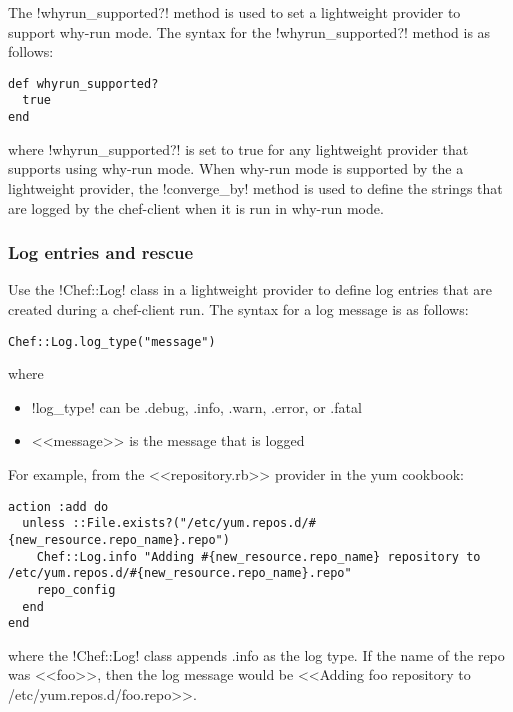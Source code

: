 The \inline!whyrun_supported?! method is used to set a lightweight provider to support why-run mode. The syntax for the \inline!whyrun_supported?! method is as follows:

\begin{lstlisting}[label=lst:cookbook-lwrp-why-run]
def whyrun_supported?
  true
end
\end{lstlisting}

where \inline!whyrun_supported?! is set to true for any lightweight provider that supports using why-run mode. When why-run mode is supported by the a lightweight provider, the \inline!converge_by! method is used to define the strings that are logged by the chef-client when it is run in why-run mode.

\subsubsection{Log entries and rescue}

Use the \inline!Chef::Log! class in a lightweight provider to define log entries that are created during a chef-client run. The syntax for a log message is as follows:

\begin{lstlisting}[label=lst:cookbook-lwrp-logs1]
Chef::Log.log_type("message")
\end{lstlisting}

where

\begin{itemize}
  \item \inline!log_type! can be .debug, .info, .warn, .error, or .fatal
  \item <<message>> is the message that is logged
\end{itemize}

For example, from the <<repository.rb>> provider in the yum cookbook:

\begin{lstlisting}[label=lst:cookbook-lwrp-logs2]
action :add do
  unless ::File.exists?("/etc/yum.repos.d/#{new_resource.repo_name}.repo")
    Chef::Log.info "Adding #{new_resource.repo_name} repository to /etc/yum.repos.d/#{new_resource.repo_name}.repo"
    repo_config
  end
end
\end{lstlisting}

where the \inline!Chef::Log! class appends .info as the log type. If the name of the repo was <<foo>>, then the log message would be <<Adding foo repository to /etc/yum.repos.d/foo.repo>>.

